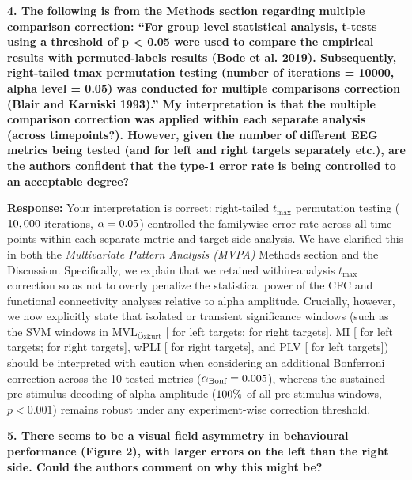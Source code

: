 \documentclass[11pt]{article}
\newcommand{\revcomment}[1]{\vspace{6pt}\noindent\textbf{\textcolor{commentgray}{#1}}\par\vspace{2pt}}
\newcommand{\authorresp}[1]{\noindent\textcolor{revblue}{\textbf{Response:}} #1\par\vspace{6pt}}
\begin{document}
\revcomment{4. The following is from the Methods section regarding multiple comparison correction: ``For group level statistical analysis, t-tests using a threshold of p < 0.05 were used to compare the empirical results with permuted-labels results (Bode et al. 2019). Subsequently, right-tailed tmax permutation testing (number of iterations = 10000, alpha level = 0.05) was conducted for multiple comparisons correction (Blair and Karniski 1993).'' My interpretation is that the multiple comparison correction was applied within each separate analysis (across timepoints?). However, given the number of different EEG metrics being tested (and for left and right targets separately etc.), are the authors confident that the type-1 error rate is being controlled to an acceptable degree?}

\authorresp{Your interpretation is correct: right-tailed $t_{\max}$ permutation testing ($10,000{}$ iterations, $\alpha = 0.05{}$) controlled the familywise error rate across all time points within each separate metric and target-side analysis. We have clarified this in both the \textit{Multivariate Pattern Analysis (MVPA)} Methods section and the Discussion. Specifically, we explain that we retained within-analysis $t_{\max}$ correction so as not to overly penalize the statistical power of the CFC and functional connectivity analyses relative to alpha amplitude. Crucially, however, we now explicitly state that isolated or transient significance windows (such as the SVM windows in $\text{MVL}_{\text{\"Ozkurt}}$ [\statSVMMVLLeftWin{} for left targets; \statSVMMVLRightWin{} for right targets], MI [\statSVMMILeftWin{} for left targets; \statSVMMIRightWin{} for right targets], wPLI [\statSVMwPLIRightWin{} for right targets], and PLV [\statSVMPLVLeftWin{} for left targets]) should be interpreted with caution when considering an additional Bonferroni correction across the 10 tested metrics ($\alpha_{\text{Bonf}} = 0.005{}$), whereas the sustained pre-stimulus decoding of alpha amplitude ($100\%{}$ of all pre-stimulus windows, $p < 0.001$) remains robust under any experiment-wise correction threshold.}

\revcomment{5. There seems to be a visual field asymmetry in behavioural performance (Figure 2), with larger errors on the left than the right side. Could the authors comment on why this might be?}
\end{document}
